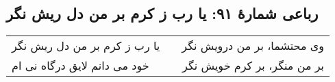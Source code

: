 \begin{center}
\section*{رباعی شمارهٔ ۹۱: یا رب ز کرم بر من دل ریش نگر}
\label{sec:091}
\begin{longtable}{l p{0.5cm} r}
یا رب ز کرم بر من دل ریش نگر
&&
وی محتشما، بر من درویش نگر
\\
خود می دانم لایق درگاه نی ام
&&
بر من منگر، بر کرم خویش نگر
\\
\end{longtable}
\end{center}
